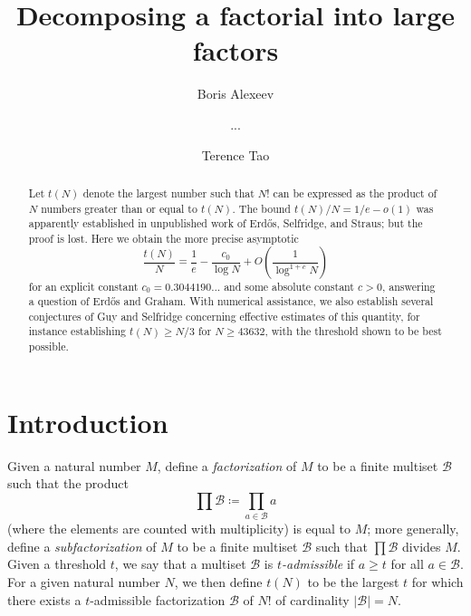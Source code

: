 \documentclass[12pt,a4paper,reqno]{amsart}
\numberwithin{equation}{section}
\theoremstyle{plain}
\theoremstyle{definition}
\newcommand\tuple{{\mathcal B}}
\begin{document}
\title{Decomposing a factorial into large factors}

\author{Boris Alexeev}
\address{???}


\author{...}
\address{???}

\author{Terence Tao}
\address{UCLA Department of Mathematics, Los Angeles, CA 90095-1555.}

\begin{abstract}  Let $t(N)$ denote the largest number such that $N!$ can be expressed as the product of $N$ numbers greater than or equal to $t(N)$.
The bound $t(N)/N = 1/e-o(1)$ was apparently established in unpublished work of Erd\H{o}s, Selfridge, and Straus; but the proof is lost.  Here we obtain the more precise asymptotic 
$$ \frac{t(N)}{N} = \frac{1}{e} - \frac{c_0}{\log N} + O\left( \frac{1}{\log^{1+c} N} \right)$$
for an explicit constant $c_0 = 0.3044190\dots$ and some absolute constant $c>0$, answering a question of Erd\H{o}s and Graham.  With numerical assistance, we also establish several conjectures of Guy and Selfridge concerning effective estimates of this quantity, for instance establishing $t(N) \geq N/3$ for $N \geq 43632$, with the threshold shown to be best possible.\end{abstract}


\maketitle


\section{Introduction}

Given a natural number $M$, define a \emph{factorization} of $M$ to be a finite multiset $\tuple$ such that the product
$$ \prod \tuple \coloneqq \prod_{a \in \tuple} a$$
(where the elements are counted with multiplicity) is equal to $M$; more generally, define a \emph{subfactorization} of $M$ to be a finite multiset $\tuple$ such that $\prod \tuple$ divides $M$.  Given a threshold $t$, we say that a multiset $\tuple$ is \emph{$t$-admissible} if $a \geq t$ for all $a \in \tuple$.  For a given natural number $N$, we then define $t(N)$ to be the largest $t$ for which there exists a $t$-admissible factorization $\tuple$ of $N!$ of cardinality $|\tuple|=N$.  
\end{document}
